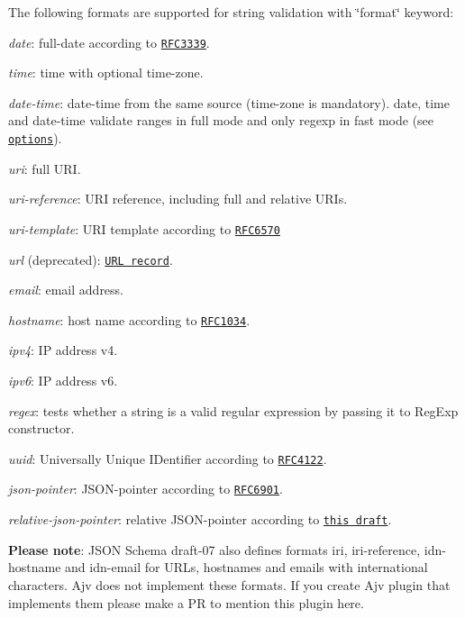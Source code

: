The following formats are supported for string validation with \char`\"{}format\char`\"{} keyword\+:


\begin{DoxyItemize}
\item {\itshape date}\+: full-\/date according to \href{http://tools.ietf.org/html/rfc3339#section-5.6}{\tt R\+F\+C3339}.
\item {\itshape time}\+: time with optional time-\/zone.
\item {\itshape date-\/time}\+: date-\/time from the same source (time-\/zone is mandatory). {\ttfamily date}, {\ttfamily time} and {\ttfamily date-\/time} validate ranges in {\ttfamily full} mode and only regexp in {\ttfamily fast} mode (see \href{#options}{\tt options}).
\item {\itshape uri}\+: full U\+RI.
\item {\itshape uri-\/reference}\+: U\+RI reference, including full and relative U\+R\+Is.
\item {\itshape uri-\/template}\+: U\+RI template according to \href{https://tools.ietf.org/html/rfc6570}{\tt R\+F\+C6570}
\item {\itshape url} (deprecated)\+: \href{https://url.spec.whatwg.org/#concept-url}{\tt U\+RL record}.
\item {\itshape email}\+: email address.
\item {\itshape hostname}\+: host name according to \href{http://tools.ietf.org/html/rfc1034#section-3.5}{\tt R\+F\+C1034}.
\item {\itshape ipv4}\+: IP address v4.
\item {\itshape ipv6}\+: IP address v6.
\item {\itshape regex}\+: tests whether a string is a valid regular expression by passing it to Reg\+Exp constructor.
\item {\itshape uuid}\+: Universally Unique I\+Dentifier according to \href{http://tools.ietf.org/html/rfc4122}{\tt R\+F\+C4122}.
\item {\itshape json-\/pointer}\+: J\+S\+O\+N-\/pointer according to \href{https://tools.ietf.org/html/rfc6901}{\tt R\+F\+C6901}.
\item {\itshape relative-\/json-\/pointer}\+: relative J\+S\+O\+N-\/pointer according to \href{http://tools.ietf.org/html/draft-luff-relative-json-pointer-00}{\tt this draft}.
\end{DoxyItemize}

{\bfseries Please note}\+: J\+S\+ON Schema draft-\/07 also defines formats {\ttfamily iri}, {\ttfamily iri-\/reference}, {\ttfamily idn-\/hostname} and {\ttfamily idn-\/email} for U\+R\+Ls, hostnames and emails with international characters. Ajv does not implement these formats. If you create Ajv plugin that implements them please make a PR to mention this plugin here.

